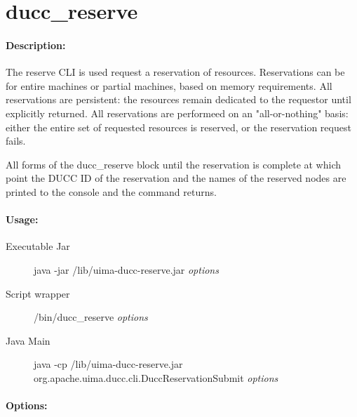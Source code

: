 \ifpdf
\else
{}
\fi
    \section{ducc\_reserve}

    \paragraph{Description:}
    The reserve CLI is used request a reservation of resources. Reservations can be for entire 
    machines or partial machines, based on memory requirements. All reservations are persistent: 
    the resources remain dedicated to the requestor until explicitly returned. All reservations are 
    performeed on an "all-or-nothing" basis: either the entire set of requested resources is reserved, 
    or the reservation request fails. 

    All forms of the ducc\_reserve block until the reservation is complete at which point the DUCC
    ID of the reservation and the names of the reserved nodes are printed to the console and the
    command returns.

    \paragraph{Usage:}
        \begin{description}
        \item[Executable Jar] java -jar \ducchome/lib/uima-ducc-reserve.jar {\em options}
        \item[Script wrapper] \ducchome/bin/ducc\_reserve {\em options}
        \item[Java Main]      java -cp \ducchome/lib/uima-ducc-reserve.jar org.apache.uima.ducc.cli.DuccReservationSubmit {\em options}
        \end{description}

    \paragraph{Options:}
    
